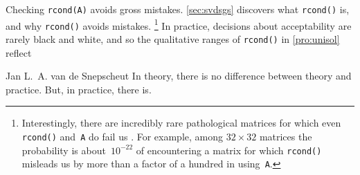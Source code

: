 Checking \verb|rcond(A)| avoids gross mistakes.
\cref{sec:svdsgs} discovers what \verb|rcond()| is, and why \verb|rcond()| avoids mistakes.%
\footnote{Interestingly, there are incredibly rare pathological matrices for which even \texttt{rcond()} and~\texttt{A\slosh} do fail us \cite[]{Driscoll07}.  
For example, among \(32\times32\) matrices the probability is about~\(10^{-22}\) of encountering a matrix for which \texttt{rcond()} misleads us by more than a factor of a hundred in using~\texttt{A\slosh}.}
In practice, decisions about acceptability are rarely black and white, and so the qualitative ranges of \verb|rcond()| in \cref{pro:unisol} reflect 

\begin{quoted}{Jan L.~A. van de Snepscheut}
In theory, there is no difference between theory and practice. 
But, in practice, there is. 
\end{quoted}



